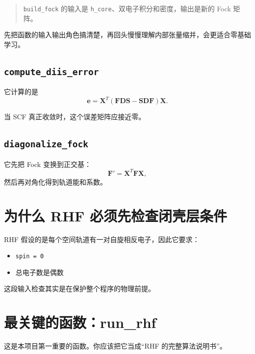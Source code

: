 \documentclass[UTF8,11pt,fontset=fandol]{ctexbook}
\begin{document}
\begin{quote}
\texttt{build\_fock} 的输入是 \texttt{h\_core}、双电子积分和密度，输出是新的 Fock 矩阵。
\end{quote}

先把函数的输入输出角色搞清楚，再回头慢慢理解内部张量缩并，会更适合零基础学习。

\subsection*{\texttt{compute\_diis\_error}}

它计算的是
\begin{equation}
\mathbf{e}=\mathbf{X}^T(\mathbf{FDS}-\mathbf{SDF})\mathbf{X}.
\end{equation}

当 SCF 真正收敛时，这个误差矩阵应接近零。

\subsection*{\texttt{diagonalize\_fock}}

它先把 Fock 变换到正交基：
\begin{equation}
\mathbf{F}'=\mathbf{X}^T\mathbf{F}\mathbf{X},
\end{equation}
然后再对角化得到轨道能和系数。

\section{为什么 RHF 必须先检查闭壳层条件}



RHF 假设的是每个空间轨道有一对自旋相反电子，因此它要求：
\begin{itemize}
  \item \texttt{spin = 0}
  \item 总电子数是偶数
\end{itemize}

这段输入检查其实是在保护整个程序的物理前提。

\section{最关键的函数：run\_rhf}



这是本项目第一重要的函数。你应该把它当成“RHF 的完整算法说明书”。
\end{document}
